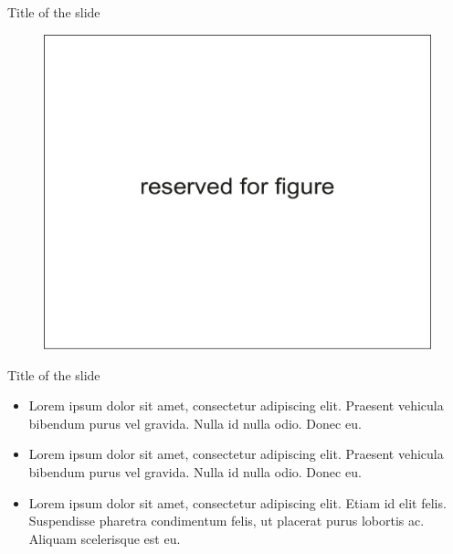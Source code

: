 \documentclass[russian,12pt,aspectratio=169,xcolor=table]{beamer}
\begin{document}
\begin{frame}{Title of the slide}
\begin{minipage}{.41\textwidth}
\begin{figure}
      \vspace{-2em}
    \end{figure}
    \begin{figure}
      \centering
      \includegraphics[height=0.45\textheight]{img/5}
    \end{figure}
  \end{minipage}
\end{frame}

\begin{frame}{Title of the slide}
  \begin{itemize}
    \item Lorem ipsum dolor sit amet, consectetur adipiscing elit. Praesent vehicula bibendum purus vel gravida. Nulla id nulla odio. Donec eu.
    \item Lorem ipsum dolor sit amet, consectetur adipiscing elit. Praesent vehicula bibendum purus vel gravida. Nulla id nulla odio. Donec eu.
    \item Lorem ipsum dolor sit amet, consectetur adipiscing elit. Etiam id elit felis. Suspendisse pharetra condimentum felis, ut placerat purus lobortis ac. Aliquam scelerisque est eu.
  \end{itemize}
\end{frame}
\end{document}
